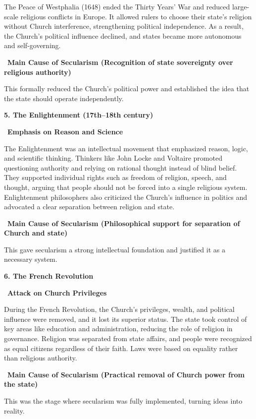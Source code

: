 \documentclass[12pt]{article}
\begin{document}
The Peace of Westphalia (1648) ended the Thirty Years’ War and reduced large-scale religious conflicts in Europe. It allowed rulers to choose their state’s religion without Church interference, strengthening political independence. As a result, the Church’s political influence declined, and states became more autonomous and self-governing.

\textbullet\ \textbf{Main Cause of Secularism (Recognition of state sovereignty over religious authority)}

This formally reduced the Church’s political power and established the idea that the state should operate independently.

\textbf{5. The Enlightenment (17th–18th century)}

\textbullet\ \textbf{Emphasis on Reason and Science}

The Enlightenment was an intellectual movement that emphasized reason, logic, and scientific thinking. Thinkers like John Locke and Voltaire promoted questioning authority and relying on rational thought instead of blind belief. They supported individual rights such as freedom of religion, speech, and thought, arguing that people should not be forced into a single religious system. Enlightenment philosophers also criticized the Church’s influence in politics and advocated a clear separation between religion and state.

\textbullet\ \textbf{Main Cause of Secularism (Philosophical support for separation of Church and state)}

This gave secularism a strong intellectual foundation and justified it as a necessary system.

\textbf{6. The French Revolution}

\textbullet\ \textbf{Attack on Church Privileges}

During the French Revolution, the Church’s privileges, wealth, and political influence were removed, and it lost its superior status. The state took control of key areas like education and administration, reducing the role of religion in governance. Religion was separated from state affairs, and people were recognized as equal citizens regardless of their faith. Laws were based on equality rather than religious authority.

\textbullet\ \textbf{Main Cause of Secularism (Practical removal of Church power from the state)}

This was the stage where secularism was fully implemented, turning ideas into reality.
\end{document}

